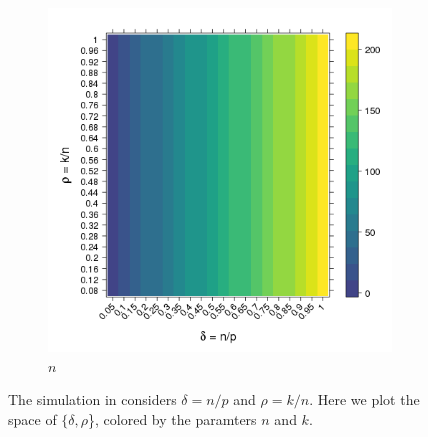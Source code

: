 \documentclass[11pt]{article}
\begin{document}
\begin{figure}[tbhp]
\begin{subfigure}[b]{0.5\linewidth}
      \includegraphics[totalheight=6cm]{./figs/n.png}
      \caption{$n$}
      \label{figure:n.png}
    \end{subfigure} 
    \caption{The simulation in  considers $\delta = n/p$ and $\rho =k/n$. Here we plot the
      space of $\{\delta, \rho$\}, colored  by the paramters $n$ and $k.$}
\end{figure}
\end{document}

